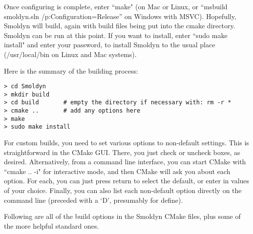 \documentclass {book}
\begin{document}
Once configuring is complete, enter ``make" (on Mac or Linux, or ``msbuild smoldyn.sln /p:Configuration=Release'' on Windows with MSVC). Hopefully, Smoldyn will build, again with build files being put into the cmake directory. Smoldyn can be run at this point. If you want to install, enter ``sudo make install" and enter your password, to install Smoldyn to the usual place (/usr/local/bin on Linux and Mac systems).

Here is the summary of the building process:

\begin{lstlisting}
> cd Smoldyn
> mkdir build
> cd build       # empty the directory if necessary with: rm -r *
> cmake ..	     # add any options here
> make
> sudo make install
\end{lstlisting}

For custom builds, you need to set various options to non-default settings. This is straightforward in the CMake GUI. There, you just check or uncheck boxes, as desired. Alternatively, from a command line interface, you can start CMake with ``cmake .. -i" for interactive mode, and then CMake will ask you about each option. For each, you can just press return to select the default, or enter in values of your choice. Finally, you can also list each non-default option directly on the command line (preceded with a `D', presumably for define).

Following are all of the build options in the Smoldyn CMake files, plus some of the more helpful standard ones.
\end{document}
